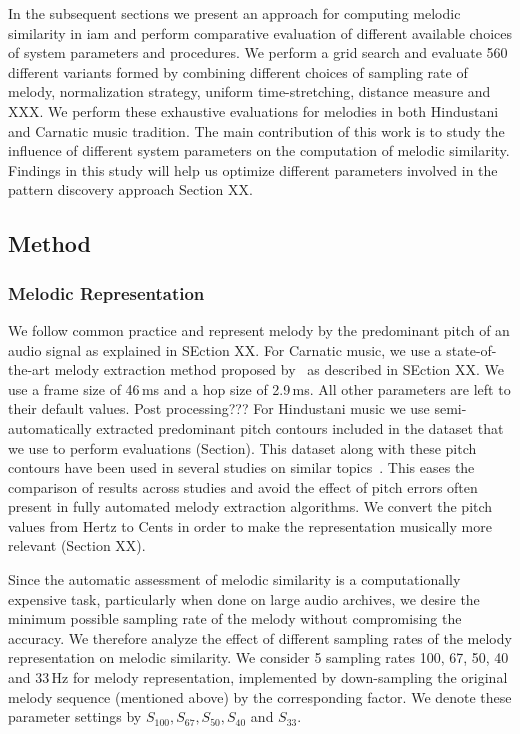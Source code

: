 In the subsequent sections we present an approach for computing melodic similarity in \gls{iam} and perform comparative evaluation of different available choices of system parameters and procedures. We perform a grid search and evaluate 560 different variants formed by combining different choices of sampling rate of melody, normalization strategy, uniform time-stretching, distance measure and XXX. We perform these exhaustive evaluations for melodies in both Hindustani and Carnatic music tradition. The main contribution of this work is to study the influence of different system parameters on the computation of melodic similarity. Findings in this study will help us optimize different parameters involved in the pattern discovery approach Section XX.

\subsection{Method}

\subsubsection{Melodic Representation}
\label{sec:patterns_melodic_similarity_representation}

We follow common practice and represent melody by the predominant pitch of an audio signal as explained in SEction XX. For Carnatic music, we use a state-of-the-art melody extraction method proposed by~\cite{Salamon2012} as described in SEction XX. We use a frame size of 46\,ms and a hop size of 2.9\,ms. All other parameters are left to their default values. Post processing??? For Hindustani music we use semi-automatically extracted predominant pitch contours included in the dataset that we use to perform evaluations (Section). This dataset along with these pitch contours have been used in several studies on similar topics~\citep{Rao2014, Ross2012b, Ross2012}. This eases the comparison of results across studies and avoid the effect of pitch errors often present in fully automated melody extraction algorithms. We convert the pitch values from Hertz to Cents in order to make the representation musically more relevant (Section XX).

Since the automatic assessment of melodic similarity is a computationally expensive task, particularly when done on large audio archives, we desire the minimum possible sampling rate of the melody without compromising the accuracy. We therefore analyze the effect of different sampling rates of the melody representation on melodic similarity. We consider 5 sampling rates 100, 67, 50, 40 and 33\,Hz for melody representation, implemented by down-sampling the original melody sequence (mentioned above) by the corresponding factor. We denote these parameter settings by $S_{100}, S_{67}, S_{50}, S_{40}$ and $S_{33}$.

